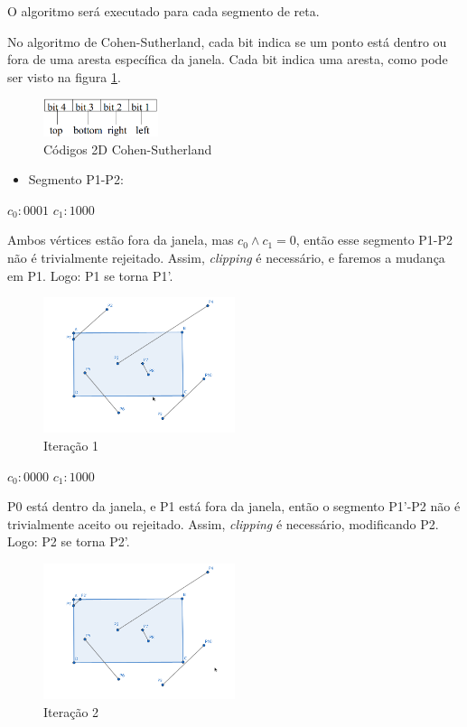 \documentclass[12pt]{article}
\begin{document}
O algoritmo será executado para cada segmento de reta.

No algoritmo de Cohen-Sutherland, cada bit indica se um ponto está dentro ou fora de uma aresta específica da janela. Cada bit indica uma aresta, como pode ser visto na figura \ref{fig:cohen}.

\begin{figure}[H]
    \centering
    \includegraphics[width=0.3\textwidth]{images/cohen.png}
    \caption{Códigos 2D Cohen-Sutherland}
    \label{fig:cohen}
\end{figure}{}

\begin{itemize}
    \item Segmento P1-P2:
\end{itemize}
$c_0: 0001$ \hspace{1cm} $c_1: 1000$

Ambos vértices estão fora da janela, mas $c_0 \land c_1 = 0$, então esse segmento P1-P2 não é trivialmente rejeitado. Assim, \textit{clipping} é necessário, e faremos a mudança em P1. Logo: P1 se torna P1'.

\begin{figure}[H]
    \centering
    \includegraphics[width=0.5\textwidth]{images/4/4it1.png}
    \caption*{Iteração 1}
\end{figure}

$c_0: 0000$ \hspace{1cm} $c_1: 1000$

P0 está dentro da janela, e P1 está fora da janela, então o segmento P1'-P2 não é trivialmente aceito ou rejeitado. Assim, \textit{clipping} é necessário, modificando P2. Logo: P2 se torna P2'.

\begin{figure}[H]
    \centering
    \includegraphics[width=0.5\textwidth]{images/4/4it2.png}
    \caption*{Iteração 2}
\end{figure}
\end{document}
